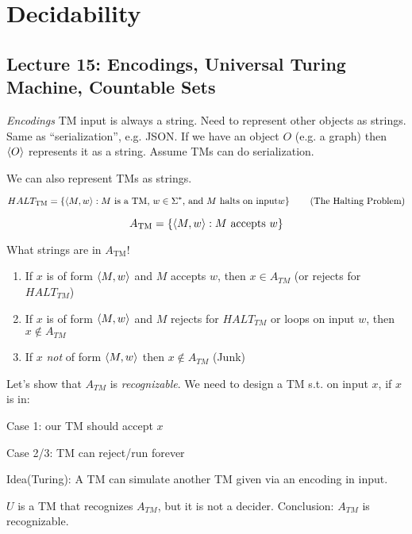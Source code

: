 \chapter{Decidability}

\section*{Lecture 15: Encodings, Universal Turing Machine, Countable Sets}

\emph{Encodings} \textsf{TM} input is always a string. Need to represent other objects as strings. Same as ``serialization'', e.g. JSON. If we have an object $O$ (e.g. a graph) then $\left \langle O \right \rangle$ represents it as a string. Assume TMs can do serialization.

We can also represent TMs as strings.

\begin{equation*}
    HALT_{\text{TM}} = \left \{ \left \langle M, w \right \rangle: M \text{ is a TM, } w \in \Sigma^* \text{, and } M \text{ halts on input} w \right \} \tag{The Halting Problem}
\end{equation*}

\begin{equation*}
    A_{\text{TM}} = \left \{ \left \langle M, w \right \rangle: M \text{ accepts } w \right \}
\end{equation*}

What strings are in $A_{\text{TM}}$!

\begin{enumerate}
    \item If $x$ is of form $\left \langle M, w \right \rangle$ and $M$ accepts $w$, then $x \in A_{TM}$ (or rejects for $HALT_{TM}$)
    \item If $x$ is of form $\left \langle M, w \right \rangle$ and $M$ rejects for $HALT_{TM}$ or loops on input $w$, then $x \notin A_{TM}$
    \item If $x$ \emph{not} of form $\left \langle M, w \right \rangle$ then $x \notin A_{TM}$ (Junk)
\end{enumerate}

Let's show that $A_{TM}$ is \emph{recognizable}. We need to design a TM s.t. on input $x$, if $x$ is in:

Case 1: our TM should accept $x$

Case 2/3: TM can reject/run forever

Idea(Turing): A TM can simulate another TM given via an encoding in input.

$U$ is a TM that recognizes $A_{TM}$, but it is not a decider. Conclusion: $A_{TM}$ is recognizable.

